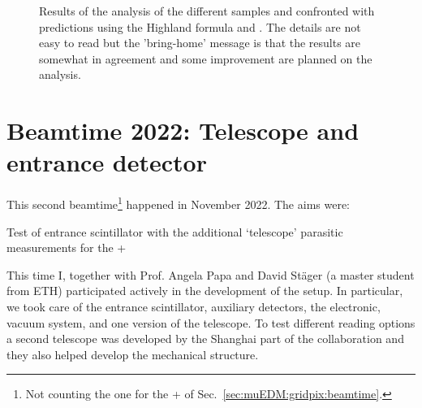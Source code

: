 \begin{refsection}
    \begin{figure}   
            \centering
            \hfill
            \caption[muEDM 2021: data and \gf comparison]{Results of the analysis of the different samples and confronted with predictions using the Highland formula and \gf. The details are not easy to read but the 'bring-home' message is that the results are somewhat in agreement and some improvement are planned on the analysis.}
            \label{fig:muEDM:bt2021:results}
        \end{figure}

\section{Beamtime 2022: Telescope and entrance detector}
\label{sec:muEDM:beamtime2022}
    This second beamtime\footnote{Not counting the one for the \tpc + \grid of Sec.~\ref{sec:muEDM:gridpix:beamtime}.} happened in November 2022.
    The aims were:
    \begin{outline}
        \1 Test of entrance scintillator with the additional `telescope'
        \1 parasitic measurements for the \tpc+ \grid
    \end{outline}
    This time I, together with Prof. Angela Papa and David St\"{a}ger (a master student from ETH) participated actively in the development of the setup. 
    In particular, we took care of the entrance scintillator, auxiliary detectors, the electronic, vacuum system, and one version of the telescope. 
    To test different reading options a second telescope was developed by the Shanghai part of the collaboration and they also helped develop the mechanical structure.


\end{refsection}
